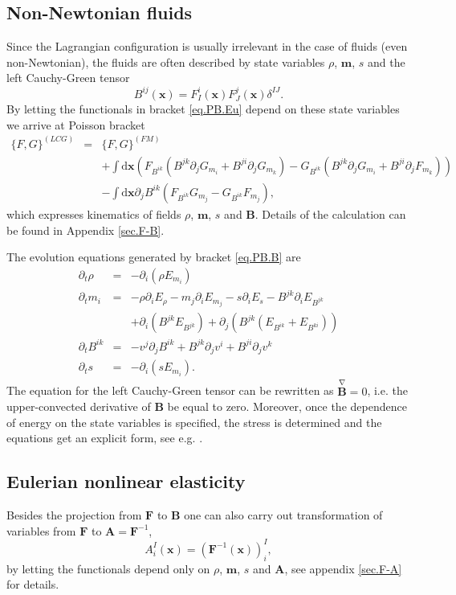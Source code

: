 \documentclass[
10pt, %
a4paper, %
oneside, %
headinclude,footinclude, %
BCOR5mm, %
]{scrartcl}
\newcommand{\xx}{\mathbf{x}}
\newcommand{\dx}{\mathrm{d}\xx}
\newcommand{\mm}{\mathbf{m}}
\newcommand{\FF}{\mathbf{F}}
\renewcommand{\AA}{\mathbf{A}}
\newcommand{\BB}{\mathbf{B}}
\begin{document}
\subsection{Non-Newtonian fluids}
Since the Lagrangian configuration is usually irrelevant in the case of fluids (even non-Newtonian), the fluids are often described by state variables $\rho$, $\mm$, $s$ and the left Cauchy-Green tensor
\begin{equation}
	B^{ij}(\xx) = F^i_I(\xx) F^j_J(\xx) \delta^{IJ}.
\end{equation}
By letting the functionals in bracket \eqref{eq.PB.Eu} depend on these state variables we arrive at Poisson bracket
\begin{eqnarray}\label{eq.PB.B}
	\{F,G\}^{(LCG)} &=& \{F,G\}^{(FM)} \nonumber\\
	&&+ \int\dx \left(F_{B^{ik}}(B^{jk}\partial_j G_{m_i}+B^{ji}\partial_j G_{m_k})-G_{B^{ik}}(B^{jk}\partial_j G_{m_i}+B^{ji}\partial_j F_{m_k})\right)\nonumber\\
	&&-\int\dx \partial_j B^{ik}(F_{B^{ik}}G_{m_j}-G_{B^{ik}}F_{m_j}),
\end{eqnarray}
which expresses kinematics of fields $\rho$, $\mm$, $s$ and $\BB$.
Details of the calculation can be found in Appendix \ref{sec.F-B}.

The evolution equations generated by bracket \eqref{eq.PB.B} are
\begin{subequations}
	\begin{eqnarray}
	\partial_t \rho &=& -\partial_i(\rho E_{m_i})\\
	\partial_t m_i &=& -\rho\partial_i E_\rho - m_j \partial_i E_{m_j} -s \partial_i E_s - B^{jk}\partial_i E_{B^{jk}} \nonumber\\
	&&+\partial_i(B^{jk}E_{B^{jk}}) + \partial_j(B^{jk}(E_{B^{ik}}+E_{B^{ki}}))\\
	\partial_t B^{ik} &=& -v^j \partial_j B^{ik} + B^{jk}\partial_j v^i + B^{ji}\partial_j v^k\\
	\partial_t s &=& -\partial_i(s E_{m_i}).
	\end{eqnarray}
\end{subequations}
The equation for the left Cauchy-Green tensor can be rewritten as $\stackrel{\nabla}{\BB}=0$, i.e. the upper-convected derivative of $\BB$ be equal to zero. Moreover, once the dependence of energy on the state variables is specified, the stress is determined and the equations get an explicit form, see e.g. \cite{PKG}.


\subsection{Eulerian nonlinear elasticity}
Besides the projection from $\FF$ to $\BB$ one can also carry out transformation of variables from $\FF$ to $\AA = \FF^{-1}$,
\begin{equation}
	A^I_i(\xx) = (\FF^{-1}(\xx))^I_i,
\end{equation}
by letting the functionals depend only on $\rho$, $\mm$, $s$ and $\AA$, see appendix \ref{sec.F-A} for details.
\end{document}

